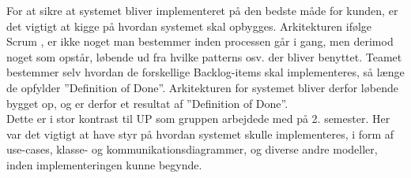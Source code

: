 For at sikre at systemet bliver implementeret på den bedste måde for kunden, 
er det vigtigt at kigge på hvordan systemet skal opbygges. 
Arkitekturen ifølge Scrum \cite{ScrumArchitecture}, er ikke noget man bestemmer inden processen går i gang,
men derimod noget som opstår, løbende ud fra hvilke patterns osv. der bliver benyttet. 
Teamet bestemmer selv hvordan de forskellige Backlog-items skal implementeres, 
så længe de opfylder ”Definition of Done”. Arkitekturen for systemet bliver derfor løbende bygget op, 
og er derfor et resultat af ”Definition of Done”. \\

Dette er i stor kontrast til UP som gruppen arbejdede med på 2. semester. 
Her var det vigtigt at have styr på hvordan systemet skulle implementeres, 
i form af use-cases, klasse- og kommunikationsdiagrammer, og diverse andre modeller, 
inden implementeringen kunne begynde. 